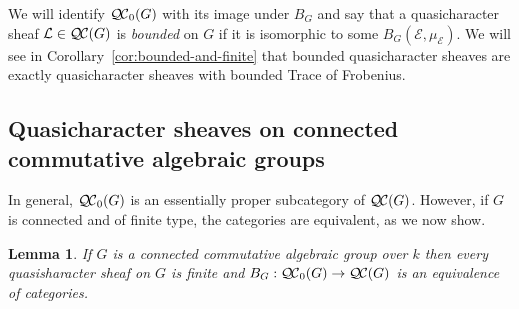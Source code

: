 \documentclass{amsart}
\theoremstyle{plain}
\newtheorem{lemma}[theorem]{Lemma}
\theoremstyle{definition}
\theoremstyle{remark}
\newcommand{\Fq}{k}
\newcommand{\qcs}[1]{{\mathcal{#1}}}
\newcommand{\QC}{{\mathcal{Q\hskip-0.8pt C}}}
\newcommand{\bQC}{{\QC_0}}
\begin{document}
We will identify $\bQC(G)$ with its image under $B_G$
and say that a quasicharacter sheaf $\qcs{L} \in \QC(G)$ is \emph{bounded} on $G$
if it is isomorphic to some $B_G(\qcs{E}, \mu_\qcs{E})$.
We will see in Corollary~\ref{cor:bounded-and-finite} that bounded quasicharacter sheaves are exactly quasicharacter sheaves with bounded Trace of Frobenius.

\subsection{Quasicharacter sheaves on connected commutative algebraic groups}\label{sec:connected}

In general, $\bQC(G)$ is an essentially
proper subcategory of $\QC(G)$. 
However, if $G$ is connected and of finite type, the categories are equivalent, as we now show.

\begin{lemma}\label{lem:bounded_connected}
If $G$ is a connected commutative algebraic group over $\Fq$ then every quasisharacter sheaf on $G$ is finite and $B_G : \bQC(G) \to \QC(G)$ is an equivalence of categories.
\end{lemma}
\end{document}
